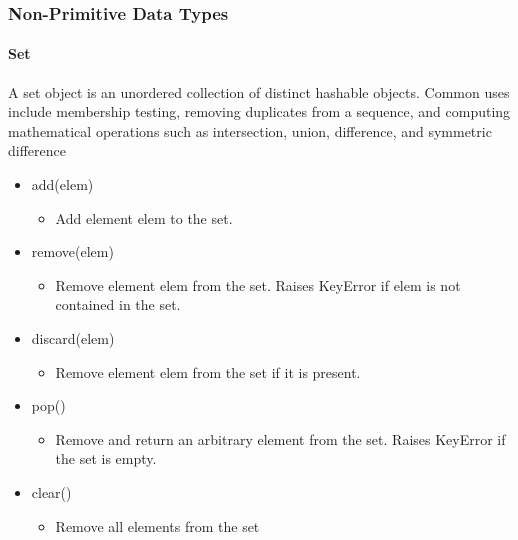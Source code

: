 \documentclass{beamer}
\begin{document}
\begin{frame}[fragile]
\frametitle{Non-Primitive Data Types}
\framesubtitle{Set}
A set object is an unordered collection of distinct hashable objects. Common uses include membership testing, removing duplicates from a sequence, and computing mathematical operations such as intersection, union, difference, and symmetric difference
\begin{itemize}
	\item add(elem)
		\begin{itemize}
		\item Add element elem to the set.
		\end{itemize}

	\item remove(elem)
		\begin{itemize}
		\item Remove element elem from the set. Raises KeyError if elem is not contained in the set.
		\end{itemize}

	\item discard(elem)
		\begin{itemize}
		\item Remove element elem from the set if it is present.
		\end{itemize}
	
	\item pop()
		\begin{itemize}
		\item Remove and return an arbitrary element from the set. Raises KeyError if the set is empty.
		\end{itemize}
		
	\item clear()
		\begin{itemize}
		\item Remove all elements from the set
		\end{itemize}
\end{itemize}


\end{frame}
\end{document}
